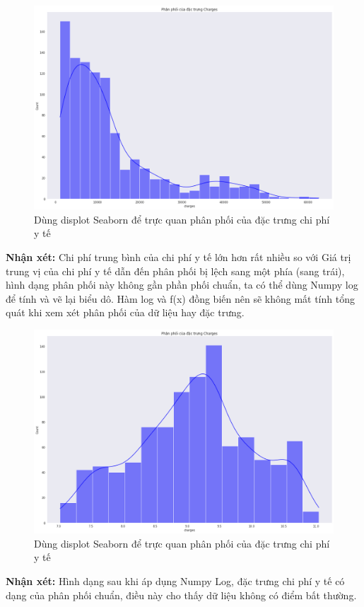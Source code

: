 \documentclass{article}
\begin{document}
	\begin{figure}[H]
		\centering
		\includegraphics[width=1\textwidth]{images/dist_medical_charges_plot.png}
		\caption{Dùng displot Seaborn để trực quan phân phối của đặc trưng chi phí y tế}
		\label{fig:writing-thesis-dist-medical-charges-plot}
	\end{figure}
	\textbf{Nhận xét:} Chi phí trung bình của chi phí y tế lớn hơn rất nhiều so với Giá trị trung vị của chi phí y tế dẫn đến phân phối bị lệch sang một phía (sang trái), hình dạng phân phối này không gần phần phối chuẩn, ta có thể dùng Numpy log để tính và vẽ lại biểu dô. Hàm log và f(x) đồng biến nên sẽ không mất tính tổng quát khi xem xét phân phối của dữ liệu hay đặc trưng.

	\begin{figure}[H]
		\centering
		\includegraphics[width=1\textwidth]{images/dist_medical_charges_plot_log_scale.png}
		\caption{Dùng displot Seaborn để trực quan phân phối của đặc trưng chi phí y tế}
		\label{fig:writing-thesis-dist-medical-charges-plot-log-scale}
	\end{figure}
	\textbf{Nhận xét:} Hình dạng sau khi áp dụng Numpy Log, đặc trưng chi phí y tế có dạng của phân phối chuẩn, điều này cho thấy dữ liệu không có điểm bất thường.
	
\end{document}
